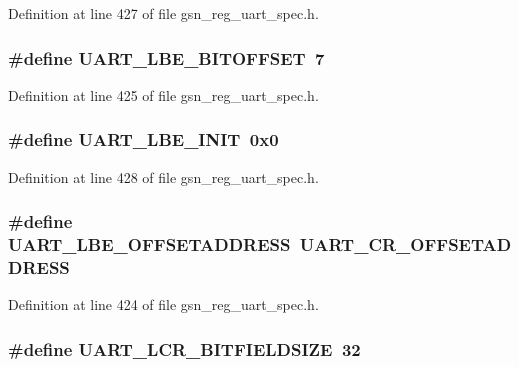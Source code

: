 Definition at line 427 of file gsn\_\-reg\_\-uart\_\-spec.h.

\hypertarget{a00575_a9be31150888552283bd8e6872b77d396}{
\subsubsection[{UART\_\-LBE\_\-BITOFFSET}]{\setlength{\rightskip}{0pt plus 5cm}\#define UART\_\-LBE\_\-BITOFFSET~7}}
\label{a00575_a9be31150888552283bd8e6872b77d396}


Definition at line 425 of file gsn\_\-reg\_\-uart\_\-spec.h.

\hypertarget{a00575_ac2cc7ae3e4e933bb1e826c862fcce98f}{
\subsubsection[{UART\_\-LBE\_\-INIT}]{\setlength{\rightskip}{0pt plus 5cm}\#define UART\_\-LBE\_\-INIT~0x0}}
\label{a00575_ac2cc7ae3e4e933bb1e826c862fcce98f}


Definition at line 428 of file gsn\_\-reg\_\-uart\_\-spec.h.

\hypertarget{a00575_ae1924da42212263089a643b5546242b9}{
\subsubsection[{UART\_\-LBE\_\-OFFSETADDRESS}]{\setlength{\rightskip}{0pt plus 5cm}\#define UART\_\-LBE\_\-OFFSETADDRESS~UART\_\-CR\_\-OFFSETADDRESS}}
\label{a00575_ae1924da42212263089a643b5546242b9}


Definition at line 424 of file gsn\_\-reg\_\-uart\_\-spec.h.

\hypertarget{a00575_a295597cd8469e3746c4bdb389595f79d}{
\subsubsection[{UART\_\-LCR\_\-BITFIELDSIZE}]{\setlength{\rightskip}{0pt plus 5cm}\#define UART\_\-LCR\_\-BITFIELDSIZE~32}}
\label{a00575_a295597cd8469e3746c4bdb389595f79d}


